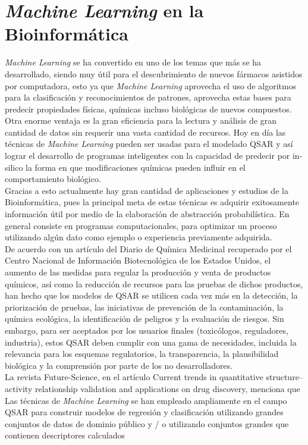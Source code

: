 \section{\textit{Machine Learning} en la Bioinformática}
\noindent \textit{Machine Learning} se ha convertido en uno de los temas que más se ha desarrollado, siendo muy útil para el descubrimiento de nuevos fármacos asistidos por computadora, esto ya que \textit{Machine Learning} aprovecha el uso de algoritmos para la clasificación y reconocimientos de patrones, aprovecha estas bases para predecir propiedades físicas, químicas incluso biológicas de nuevos compuestos. Otra enorme ventaja es la gran eficiencia para la lectura y análisis de gran cantidad de datos sin requerir una vasta cantidad de recursos.  Hoy en día las técnicas de \textit{Machine Learning} pueden ser usadas para el modelado QSAR y así lograr el desarrollo de programas inteligentes con la capacidad de predecir por in-silico la forma en que modificaciones químicas pueden influir en el comportamiento biológico.\\

\noindent Gracias a esto actualmente hay gran cantidad de aplicaciones y estudios de la Bioinformática, pues la principal meta de estas técnicas es adquirir exitosamente información útil por medio de la elaboración de abstracción probabilística.  En general consiste en programas computacionales, para optimizar un proceso utilizando algún dato como ejemplo o experiencia previamente adquirida.\\

\noindent De acuerdo con un artículo del Diario de Química Medicinal recuperado por el Centro Nacional de Información Biotecnológica de los Estados Unidos, el aumento de las medidas para regular la producción y venta de productos químicos, así como la reducción de recursos para las pruebas de dichos productos, han hecho que los modelos de QSAR se utilicen cada vez más en la detección, la priorización de pruebas, las iniciativas de prevención de la contaminación, la química ecológica, la identificación de peligros y la evaluación de riesgos. Sin embargo, para ser aceptados por los usuarios finales (toxicólogos, reguladores, industria), estos QSAR deben cumplir con una gama de necesidades, incluida la relevancia para los esquemas regulatorios, la transparencia, la plausibilidad biológica y la comprensión por parte de los no desarrolladores.\\

\noindent La revista Future-Science, en el artículo Current trends in quantitative structure–activity relationship validation and applications on drug discovery, menciona que Las técnicas de \textit{Machine Learning} se han empleado ampliamente en el campo QSAR para construir modelos de regresión y clasificación utilizando grandes conjuntos de datos de dominio público y / o utilizando conjuntos grandes que contienen descriptores calculados

